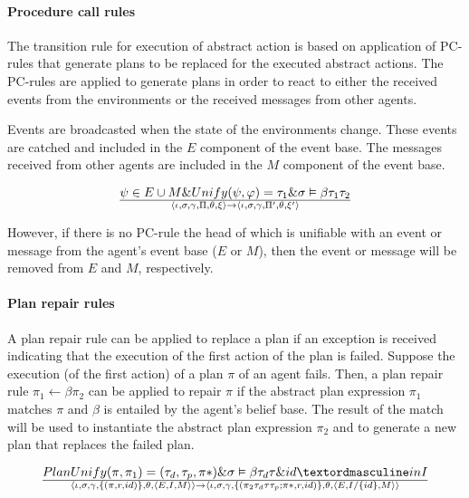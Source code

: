 \documentclass[a4paper]{article}
\begin{document}
\paragraph{Procedure call rules}

The transition rule for execution of abstract action is based on application of PC-rules that generate plans to be replaced for the executed abstract actions. The PC-rules are applied to generate plans in order to react to either the received events from the environments or the received messages from other agents.

Events are broadcasted when the state of the environments change. These events are catched and included in the $E$ component of the event base. The messages received from other agents are included in the $M$ component of the event base.

$${ \psi \in E \cup M \& Unify(\psi, \varphi) = \tau_{1} \& \sigma \vDash \beta \tau_{1} \tau_{2} } \over {\langle \iota, \sigma, \gamma, \Pi, \theta, \xi \rangle \rightarrow \langle \iota, \sigma, \gamma, \Pi', \theta, \xi' \rangle}$$

However, if there is no PC-rule the head of which is unifiable with an event or message from the agent's event base ($E$ or $M$), then the event or message will be removed from $E$ and $M$, respectively.

\paragraph{Plan repair rules}

A plan repair rule can be applied to replace a plan if an exception is received indicating that
the execution of the first action of the plan is failed. Suppose the execution (of the first action)
of a plan $\pi$ of an agent fails. Then, a plan repair rule $\pi_{1} \leftarrow \beta \pi_{2}$ can be applied to repair $\pi$ if the abstract plan expression $\pi_{1}$ matches $\pi$ and $\beta$ is entailed by the agent's belief base. The result of the match will be used to instantiate the abstract plan expression $\pi_{2}$ and to generate a new plan that replaces the failed plan.

$$ {Plan Unify(\pi, \pi_{1}) = (\tau_{d}, \tau_{p}, \pi *) \& \sigma \vDash \beta\tau_{d}\tau \& id ºin I} \over {\langle \iota, \sigma, \gamma, \{(\pi, r, id)\}, \theta, \langle E, I, M \rangle \rangle \rightarrow \langle \iota, \sigma, \gamma, \{(\pi_{2}\tau_{d}\tau\tau_{p};\pi *, r, id)\}, \theta, \langle E, I/\{id\}, M \rangle \rangle}$$
\end{document}
